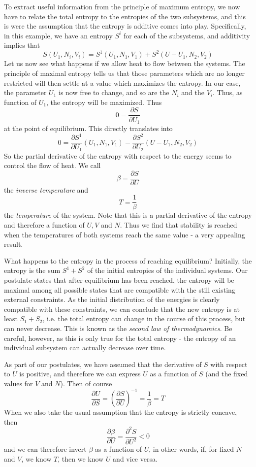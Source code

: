 \documentclass[a4paper, draft]{report}
\numberwithin{section}{chapter}
\numberwithin{equation}{chapter}
\theoremstyle{own}
\theoremstyle{remark}
\begin{document}
 
To extract useful information from the principle of maximum entropy, we now have to relate the total entropy to the entropies of the two subsystems, and this is were the assumption that the entropy is additive comes into play. Specifically, in this example,
we have an entropy $S^i$ for each of the subsystems, and additivity implies that
$$
S(U_1, N_i, V_i) = S^1(U_1, N_1, V_1) + S^2(U - U_1, N_2, V_2)
$$
Let us now see what happens if we allow heat to flow between the systems. The principle of maximal entropy tells us that those parameters which are no longer restricted will then settle at a value which maximizes the entropy. In our case, the parameter $U_1$ is now free to change, and so are the $N_i$ and the $V_i$. Thus, as function of $U_1$, the entropy will be maximized. Thus
$$
0 = \frac{\partial S}{\partial U_1}
$$
at the point of equilibrium. This directly translates into 
$$
0 = \frac{\partial S^1}{\partial U_1}(U_1, N_1, V_1) - \frac{\partial S^2}{\partial U_2}(U - U_1, N_2, V_2)
$$
So the partial derivative of the entropy with respect to the energy seems to control the flow of heat. We call
$$
\beta = \frac{\partial S}{\partial U}
$$
the {\em inverse temperature} and 
$$
T = \frac{1}{\beta}
$$
the {\em temperature} of the system. Note that this is a partial derivative of the entropy and therefore a function of $U, V$ and $N$. Thus we find that stability is reached when the temperatures of both systems reach the same value - a very appealing result. 

What happens to the entropy in the process of reaching equilibrium? Initially, the entropy is the sum $S^1 + S^2$ of the initial entropies of the individual systems. Our postulate states that after equilibrium has been reached, the entropy will be maximal among all possible states that are compatible with the still existing external constraints. As the initial distribution of the energies is clearly compatible with these constraints, we can conclude that the new entropy is at least $S_1 + S_2$, i.e. the total entropy can change in the course of this process, but can never decrease. This is known as the {\em second law of thermodynamics}. Be careful, however, as this is only true for the total entropy - the entropy of an individual subsystem can actually decrease over time.

As part of our postulates, we have assumed that the derivative of $S$ with respect to $U$ is positive, and therefore we can express $U$ as a function of $S$ (and the fixed values for $V$ and $N$). Then of course 
$$
\frac{\partial U}{\partial S} =  (\frac{\partial S}{\partial U})^{-1} = \frac{1}{\beta} = T
$$
When we also take the usual assumption that the entropy is strictly concave, then
$$
\frac{\partial \beta}{\partial U} = \frac{\partial^2 S}{\partial U^2} < 0
$$
and we can therefore invert $\beta$ as a function of $U$, in other words, if, for fixed $N$ and $V$, we know $T$, then we know $U$ and vice versa.
\end{document}
